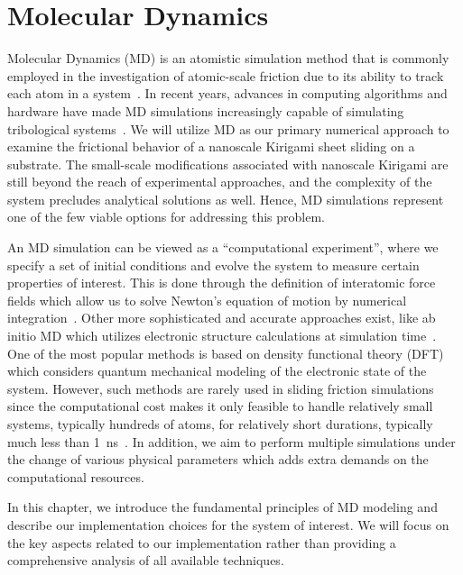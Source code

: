 \chapter{Molecular Dynamics}\label{chap:MD}
Molecular Dynamics (\acrshort{MD}) is an atomistic simulation method that is commonly employed in the investigation of atomic-scale friction due to its ability to track each atom in a system~\cite{Yalin_2011}. In recent years, advances in computing algorithms and hardware have made \acrshort{MD} simulations increasingly capable of simulating tribological systems~\cite{Manini_2016}. We will utilize \acrshort{MD} as our primary numerical approach to examine the frictional behavior of a nanoscale Kirigami sheet sliding on a substrate. The small-scale modifications associated with nanoscale Kirigami are still beyond the reach of experimental approaches, and the complexity of the system precludes analytical solutions as well. Hence, \acrshort{MD} simulations represent one of the few viable options for addressing this problem.

An \acrshort{MD} simulation can be viewed as a ``computational experiment'', where we specify a set of initial conditions and evolve the system to measure certain properties of interest. This is done through the definition of interatomic force fields which allow us to solve Newton's equation
of motion by numerical integration~\cite[p. 303]{BHUSHAN20051507}. Other more sophisticated and accurate approaches exist, like ab initio \acrshort{MD} which utilizes electronic structure calculations at simulation time~\cite{carloni_role_2002}. One of the most popular methods is based on density functional theory (DFT)~\cite{PhysRev.136.B864} which considers quantum mechanical modeling of the electronic state of the system. However, such methods are rarely used in sliding friction simulations since the computational cost makes it only feasible to handle relatively small systems, typically hundreds of atoms, for relatively short durations, typically much less than \SI{1}{ns}~\cite{Vanossi_2013}. In addition, we aim to perform multiple simulations under the
change of various physical parameters which adds extra demands on the computational resources.

In this chapter, we introduce the fundamental principles of \acrshort{MD} modeling and describe our implementation choices for the system of interest. We will focus on the key aspects related to our implementation rather than providing a comprehensive analysis of all available techniques.





